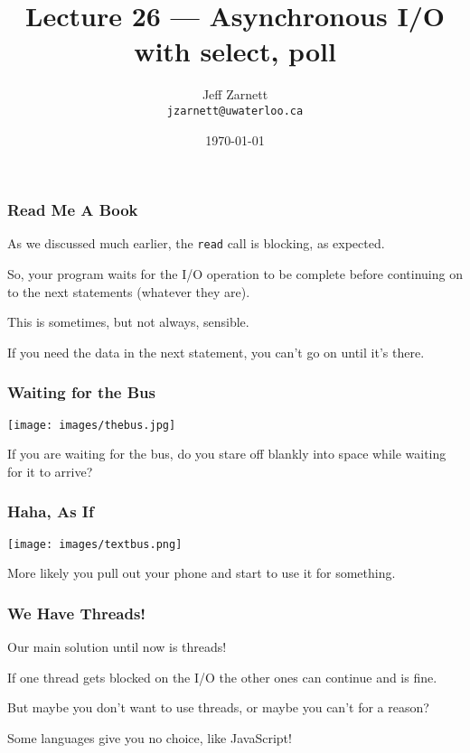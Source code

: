 

\title{Lecture 26 --- Asynchronous I/O with select, poll }

\author{Jeff Zarnett \\ \small \texttt{jzarnett@uwaterloo.ca}}
\date{\today}




\begin{frame}
	\titlepage

\end{frame}


\begin{frame}
	\frametitle{Read Me A Book}

	As we discussed much earlier, the \texttt{read} call is blocking, as expected.

	So, your program waits for the I/O operation to be complete before continuing on to the next statements (whatever they are).

	This is sometimes, but not always, sensible.

	If you need the data in the next statement, you can't go on until it's there.

\end{frame}


\begin{frame}
	\frametitle{Waiting for the Bus}

	\begin{center}
		\texttt{[image: images/thebus.jpg]}
	\end{center}

	If you are waiting for the bus, do you stare off blankly into space while waiting for it to arrive?

\end{frame}

\begin{frame}
	\frametitle{Haha, As If}

	\begin{center}
		\texttt{[image: images/textbus.png]}
	\end{center}

	More likely you pull out your phone and start to use it for something.

\end{frame}

\begin{frame}
	\frametitle{We Have Threads!}

	Our main solution until now is threads!

	If one thread gets blocked on the I/O the other ones can continue and is fine.

	But maybe you don't want to use threads, or maybe you can't for a reason?

	Some languages give you no choice, like JavaScript!

\end{frame}


